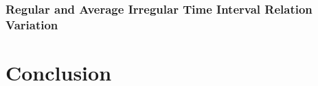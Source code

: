 \subsection{Regular and Average Irregular Time Interval Relation Variation}

\chapter{Conclusion}

\postextual



%
%




